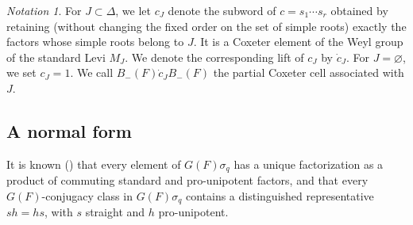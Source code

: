\documentclass[11pt]{amsart}
\numberwithin{equation}{section}
\theoremstyle{definition}
\theoremstyle{remark}
\newtheorem{notation}[notation]{Notation}
\begin{document}
\begin{notation}\label{cJ}
For $J\subset\Delta$, we let $c_J$ denote the subword of
$c=s_{1}\cdots s_{r}$ obtained by retaining (without changing the fixed order on the set of simple roots) exactly the factors whose simple roots belong to $J$. It is a Coxeter element of the Weyl group of the standard Levi $M_J$. We denote the corresponding lift of $c_{J}$ by $\dot{c}_J$. For $J=\varnothing$, we set $c_J=1$. We call $B_{-}(F)\dot{c}_JB_{-}(F)$ the partial Coxeter cell associated with $J$.
\end{notation}
\subsection{A normal form}
It is known (\cite[Theorem~1.1]{NZ}) that every element of $G(F)\sigma_q$ has a unique factorization as a product of commuting
standard and pro-unipotent factors, and that every
$G(F)$-conjugacy class in $G(F)\sigma_q$ contains a distinguished representative $sh=hs$, with $s$ straight and $h$ pro-unipotent.
 
\end{document}

